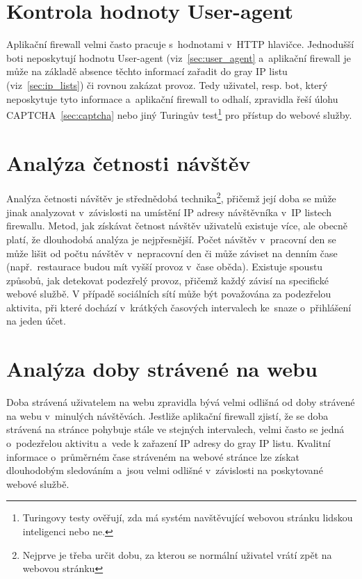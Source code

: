 \section*{Kontrola hodnoty User-agent}
Aplikační firewall velmi často pracuje s~hodnotami v~HTTP hlavičce. Jednodušší boti neposkytují hodnotu User-agent (viz~\ref{sec:user_agent} a~aplikační firewall je může na základě absence těchto informací zařadit do gray IP listu (viz~\ref{sec:ip_lists}) či rovnou zakázat provoz. Tedy uživatel, resp. bot, který neposkytuje tyto informace a~aplikační firewall to odhalí, zpravidla řeší úlohu CAPTCHA~\ref{sec:captcha} nebo jiný Turingův test\footnote{Turingovy testy ověřují, zda má systém navštěvující webovou stránku lidskou inteligenci nebo ne.} pro přístup do webové služby.

\section*{Analýza četnosti návštěv}
Analýza četnosti návštěv je střednědobá technika\footnote{Nejprve je třeba určit dobu, za kterou se normální uživatel vrátí zpět na webovou stránku}, přičemž její doba se může jinak analyzovat v~závislosti na umístění IP adresy návštěvníka v~IP listech firewallu. Metod, jak získávat četnost návštěv uživatelů existuje více, ale obecně platí, že dlouhodobá analýza je nejpřesnější. Počet návštěv v~pracovní den se může lišit od počtu návštěv v~nepracovní den či může záviset na denním čase (např.~restaurace budou mít vyšší provoz v~čase oběda). Existuje spoustu způsobů, jak detekovat podezřelý provoz, přičemž každý závisí na specifické webové službě. V případě sociálních sítí může být považována za podezřelou aktivita, při které dochází v~krátkých časových intervalech ke~snaze o~přihlášení na jeden účet.

\section*{Analýza doby strávené na webu}
\label{sec:time_analysis}
Doba strávená uživatelem na webu zpravidla bývá velmi odlišná od doby strávené na webu v~minulých návštěvách. Jestliže aplikační firewall zjistí, že se doba strávená na stránce pohybuje stále ve stejných intervalech, velmi často se jedná o~podezřelou aktivitu a~vede k zařazení IP adresy do gray IP listu. Kvalitní informace o~průměrném čase stráveném na webové stránce lze získat dlouhodobým sledováním a~jsou velmi odlišné v~závislosti na poskytované webové službě.

